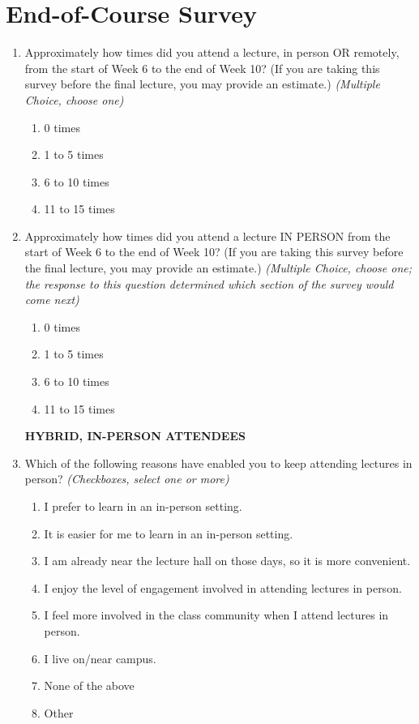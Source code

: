 \chapter{End-of-Course Survey}\label{sec:appendix_c}
\begin{enumerate}
    \item Approximately how times did you attend a lecture, in person OR remotely, from the start of Week 6 to the end of Week 10? (If you are taking this survey before the final lecture, you may provide an estimate.) \textit{(Multiple Choice, choose one)}
    \begin{enumerate}
        \item 0 times
        \item 1 to 5 times
        \item 6 to 10 times
        \item 11 to 15 times
    \end{enumerate}

    \item Approximately how times did you attend a lecture IN PERSON from the start of Week 6 to the end of Week 10? (If you are taking this survey before the final lecture, you may provide an estimate.) \textit{(Multiple Choice, choose one; the response to this question determined which section of the survey would come next)}
    \begin{enumerate}
        \item 0 times
        \item 1 to 5 times
        \item 6 to 10 times
        \item 11 to 15 times
    \end{enumerate}

\noindent \textbf{HYBRID, IN-PERSON ATTENDEES}

    \item Which of the following reasons have enabled you to keep attending lectures in person? \textit{(Checkboxes, select one or more)}
    \begin{enumerate}
        \item I prefer to learn in an in-person setting.
        \item It is easier for me to learn in an in-person setting.
        \item I am already near the lecture hall on those days, so it is more convenient.
        \item I enjoy the level of engagement involved in attending lectures in person.
        \item I feel more involved in the class community when I attend lectures in person.
        \item I live on/near campus.
        \item None of the above
        \item Other
    \end{enumerate}


\end{enumerate}
